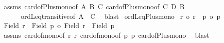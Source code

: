 \begin{isabellebody}
%
\isadelimproof
%
\endisadelimproof
%
\isatagproof
{}\isamarkupfalse%
\ assms\ card{\isacharunderscore}{\kern0pt}of{\isacharunderscore}{\kern0pt}Plus{\isacharunderscore}{\kern0pt}mono{}{\isacharbrackleft}{\kern0pt}of\ A\ B\ C{\isacharbrackright}{\kern0pt}\ card{\isacharunderscore}{\kern0pt}of{\isacharunderscore}{\kern0pt}Plus{\isacharunderscore}{\kern0pt}mono{}{\isacharbrackleft}{\kern0pt}of\ C\ D\ B{\isacharbrackright}{\kern0pt}\isanewline
\ \ \ \ \ \ ordLeq{\isacharunderscore}{\kern0pt}transitive{\isacharbrackleft}{\kern0pt}of\ {\isachardoublequoteopen}{\isacharbar}{\kern0pt}A\ {\isacharless}{\kern0pt}{\isacharplus}{\kern0pt}{\isachargreater}{\kern0pt}\ C{\isacharbar}{\kern0pt}{\isachardoublequoteclose}{\isacharbrackright}{\kern0pt}\ \isamarkupfalse%
\ blast%
\endisatagproof
{\isafoldproof}%
%
\isadelimproof
\isanewline
%
\endisadelimproof
\isanewline
{}\isamarkupfalse%
\ ordLeq{\isacharunderscore}{\kern0pt}Plus{\isacharunderscore}{\kern0pt}mono{\isacharcolon}{\kern0pt}\isanewline
{}\ {\isachardoublequoteopen}r\ {\isasymle}o\ r{\isacharprime}{\kern0pt}{\isachardoublequoteclose}\ \ {\isachardoublequoteopen}p\ {\isasymle}o\ p{\isacharprime}{\kern0pt}{\isachardoublequoteclose}\isanewline
{}\ {\isachardoublequoteopen}{\isacharbar}{\kern0pt}{\isacharparenleft}{\kern0pt}Field\ r{\isacharparenright}{\kern0pt}\ {\isacharless}{\kern0pt}{\isacharplus}{\kern0pt}{\isachargreater}{\kern0pt}\ {\isacharparenleft}{\kern0pt}Field\ p{\isacharparenright}{\kern0pt}{\isacharbar}{\kern0pt}\ {\isasymle}o\ {\isacharbar}{\kern0pt}{\isacharparenleft}{\kern0pt}Field\ r{\isacharprime}{\kern0pt}{\isacharparenright}{\kern0pt}\ {\isacharless}{\kern0pt}{\isacharplus}{\kern0pt}{\isachargreater}{\kern0pt}\ {\isacharparenleft}{\kern0pt}Field\ p{\isacharprime}{\kern0pt}{\isacharparenright}{\kern0pt}{\isacharbar}{\kern0pt}{\isachardoublequoteclose}\isanewline
%
\isadelimproof
%
\endisadelimproof
%
\isatagproof
{}\isamarkupfalse%
\ assms\ card{\isacharunderscore}{\kern0pt}of{\isacharunderscore}{\kern0pt}mono{}{\isacharbrackleft}{\kern0pt}of\ r\ r{\isacharprime}{\kern0pt}{\isacharbrackright}{\kern0pt}\ card{\isacharunderscore}{\kern0pt}of{\isacharunderscore}{\kern0pt}mono{}{\isacharbrackleft}{\kern0pt}of\ p\ p{\isacharprime}{\kern0pt}{\isacharbrackright}{\kern0pt}\ card{\isacharunderscore}{\kern0pt}of{\isacharunderscore}{\kern0pt}Plus{\isacharunderscore}{\kern0pt}mono\ \isamarkupfalse%
\ blast%
\endisatagproof
{\isafoldproof}%

\end{isabellebody}
